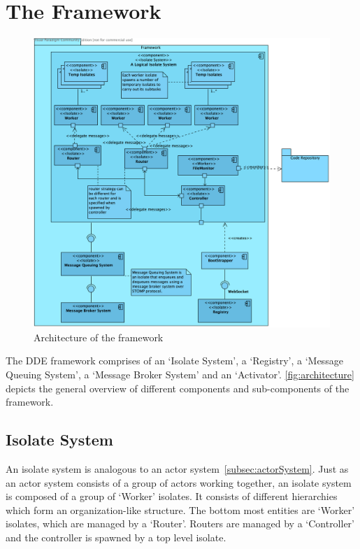 \section{The Framework}
\begin{figure}[H]
  \centering
  \includegraphics[width=1\textwidth]{figures/componentDiagram}
  \caption[Architecture of the framework]{Architecture of the framework}
  \label{fig:architecture}
\end{figure}

The DDE framework comprises of an ‘Isolate System’, a ‘Registry’, a ‘Message Queuing System’, a ‘Message Broker System’ and an ‘Activator’. \autoref{fig:architecture} depicts the general overview of different components and sub-components of the framework.

  \subsection{Isolate System}
  \label{sub:isolate-system}
  An isolate system is analogous to an actor system~\autoref{subsec:actorSystem}. Just as an actor system consists of a group of actors working together, an isolate system is composed of a group of ‘Worker’ isolates. It consists of different hierarchies which form an organization-like structure. The bottom most entities are ‘Worker’ isolates, which are managed by a ‘Router’. Routers are managed by a ‘Controller’ and the controller is spawned by a top level isolate.

